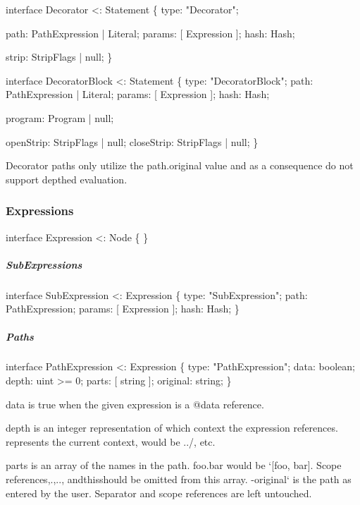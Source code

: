 \begin{DoxyCode}
\textcolor{keyword}{interface }Decorator <: Statement \{
    type: \textcolor{stringliteral}{"Decorator"};

    path: PathExpression | Literal;
    params: [ Expression ];
    hash: Hash;

    strip: StripFlags | null;
\}

\textcolor{keyword}{interface }DecoratorBlock <: Statement \{
    type: \textcolor{stringliteral}{"DecoratorBlock"};
    path: PathExpression | Literal;
    params: [ Expression ];
    hash: Hash;

    program: Program | null;

    openStrip: StripFlags | null;
    closeStrip: StripFlags | null;
\}
\end{DoxyCode}


Decorator paths only utilize the {\ttfamily path.\+original} value and as a consequence do not support depthed evaluation.

\subsubsection*{Expressions}


\begin{DoxyCode}
\textcolor{keyword}{interface }Expression <: Node \{ \}
\end{DoxyCode}


\subparagraph*{Sub\+Expressions}


\begin{DoxyCode}
\textcolor{keyword}{interface }SubExpression <: Expression \{
    type: \textcolor{stringliteral}{"SubExpression"};
    path: PathExpression;
    params: [ Expression ];
    hash: Hash;
\}
\end{DoxyCode}


\subparagraph*{Paths}


\begin{DoxyCode}
\textcolor{keyword}{interface }PathExpression <: Expression \{
    type: \textcolor{stringliteral}{"PathExpression"};
    data: boolean;
    depth: uint >= 0;
    parts: [ string ];
    original: string;
\}
\end{DoxyCode}



\begin{DoxyItemize}
\item {\ttfamily data} is true when the given expression is a {\ttfamily @data} reference.
\item {\ttfamily depth} is an integer representation of which context the expression references. {} represents the current context, {} would be {\ttfamily ../}, etc.
\item {\ttfamily parts} is an array of the names in the path. {\ttfamily foo.\+bar} would be `\mbox{[}\textquotesingle{}foo\textquotesingle{}, \textquotesingle{}bar\textquotesingle{}\mbox{]}{\ttfamily . Scope references,}.{\ttfamily ,}..{\ttfamily , and}this{\ttfamily should be omitted from this array. -\/}original` is the path as entered by the user. Separator and scope references are left untouched.
\end{DoxyItemize}

